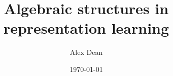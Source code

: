\documentclass[justified]{LaTeX/tufte-book}
\title{Algebraic structures in representation learning}
\author{Alex Dean}
\date{\today}
\begin{document}





\mainmatter



% 
% 




\begin{appendices}
    \setappendixformat
    
\end{appendices}

\backmatter
\begin{fullwidth}
	\printbibliography
\end{fullwidth}
\end{document}
